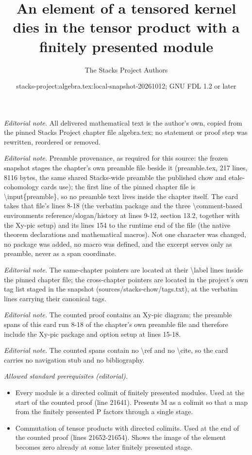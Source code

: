 \documentclass[10pt,a4paper]{amsart}
\title{An element of a tensored kernel dies in the tensor product with a finitely presented module}
\author{The Stacks Project Authors}
\date{stacks-project:algebra.tex:local-snapshot-20261012; GNU FDL 1.2 or later}
\theoremstyle{plain}
\theoremstyle{definition}
\theoremstyle{remark}
\numberwithin{equation}{subsection}
\begin{document}
\maketitle
\noindent\textit{Editorial note.} All delivered mathematical text is the author's own, copied from the pinned Stacks Project chapter file algebra.tex; no statement or proof step was rewritten, reordered or removed.\par\medskip
\noindent\textit{Editorial note.} Preamble provenance, as required for this source: the frozen snapshot stages the chapter's own preamble file beside it (preamble.tex, 217 lines, 8116 bytes, the same shared Stacks-wide preamble the published chow and etale-cohomology cards use); the first line of the pinned chapter file is \textbackslash{}input\{preamble\}, so no preamble text lives inside the chapter itself. The card takes that file's lines 8-18 (the verbatim package and the three \textbackslash{}comment-based environments reference/slogan/history at lines 9-12, section 13.2, together with the Xy-pic setup) and its lines 154 to the runtime end of the file (the native theorem declarations and mathematical macros). Not one character was changed, no package was added, no macro was defined, and the excerpt serves only as preamble, never as a span coordinate.\par\medskip
\noindent\textit{Editorial note.} The same-chapter pointers are located at their \textbackslash{}label lines inside the pinned chapter file; the cross-chapter pointers are located in the project's own tag list staged in the snapshot (sources/stacks-chow/tags.txt), at the verbatim lines carrying their canonical tags.\par\medskip
\noindent\textit{Editorial note.} The counted proof contains an Xy-pic diagram; the preamble spans of this card run 8-18 of the chapter's own preamble file and therefore include the Xy-pic package and option setup at lines 15-18.\par\medskip
\noindent\textit{Editorial note.} The counted spans contain no \textbackslash{}ref and no \textbackslash{}cite, so the card carries no navigation stub and no bibliography.\par\medskip
\noindent\textit{Allowed standard prerequisites (editorial).}\begin{itemize}
\item Every module is a directed colimit of finitely presented modules. Used at the start of the counted proof (line 21641). Presents M as a colimit so that a map from the finitely presented P factors through a single stage.
\item Commutation of tensor products with directed colimits. Used at the end of the counted proof (lines 21652-21654). Shows the image of the element becomes zero already at some later finitely presented stage.
\end{itemize}\medskip
\end{document}
